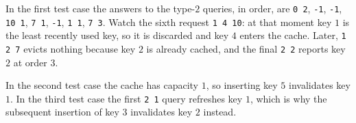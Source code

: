 In the first test case the answers to the type-$2$ queries, in order, are \texttt{0 2}, \texttt{-1}, \texttt{-1}, \texttt{10 1}, \texttt{7 1}, \texttt{-1}, \texttt{1 1}, \texttt{7 3}. Watch the sixth request \texttt{1 4 10}: at that moment key $1$ is the least recently used key, so it is discarded and key $4$ enters the cache. Later, \texttt{1 2 7} evicts nothing because key $2$ is already cached, and the final \texttt{2 2} reports key $2$ at order $3$.

In the second test case the cache has capacity $1$, so inserting key $5$ invalidates key $1$. In the third test case the first \texttt{2 1} query refreshes key $1$, which is why the subsequent insertion of key $3$ invalidates key $2$ instead.
